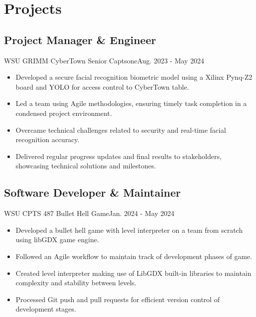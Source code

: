 \section{Projects}
\subsection{Project Manager \& Engineer}{WSU GRIMM CyberTown Senior Captsone}{Aug. 2023 - May 2024}
\begin{itemize}
    \item Developed a secure facial recognition biometric model using a Xilinx Pynq-Z2 board and YOLO for access control to CyberTown table.
    \item Led a team using Agile methodologies, ensuring timely task completion in a condensed project environment.
    \item Overcame technical challenges related to security and real-time facial recognition accuracy.
    \item Delivered regular progress updates and final results to stakeholders, showcasing technical solutions and milestones.
\end{itemize}
\subsection{Software Developer \& Maintainer}{WSU CPTS 487 Bullet Hell Game}{Jan. 2024 - May 2024}
\begin{itemize}
    \item Developed a bullet hell game with level interpreter on a team from scratch using libGDX game engine.
    \item Followed an Agile workflow to maintain track of development phases of game.
    \item Created level interpreter making use of LibGDX built-in libraries to maintain complexity and stability between levels.
    \item Processed Git push and pull requests for efficient version control of development stages.
\end{itemize}